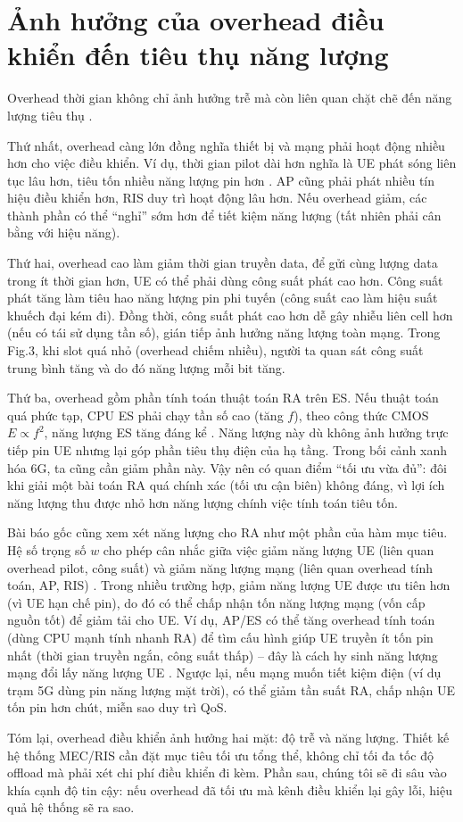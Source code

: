 \section{Ảnh hưởng của overhead điều khiển đến tiêu thụ năng lượng}

Overhead thời gian không chỉ ảnh hưởng trễ mà còn liên quan chặt chẽ đến năng lượng tiêu thụ .


Thứ nhất, overhead càng lớn đồng nghĩa thiết bị và mạng phải hoạt động nhiều hơn cho việc điều khiển. Ví dụ, thời gian pilot dài hơn nghĩa là UE phát sóng liên tục lâu hơn, tiêu tốn nhiều năng lượng pin hơn . AP cũng phải phát nhiều tín hiệu điều khiển hơn, RIS duy trì hoạt động lâu hơn. Nếu overhead giảm, các thành phần có thể “nghỉ” sớm hơn để tiết kiệm năng lượng (tất nhiên phải cân bằng với hiệu năng).


Thứ hai, overhead cao làm giảm thời gian truyền data, để gửi cùng lượng data trong ít thời gian hơn, UE có thể phải dùng công suất phát cao hơn. Công suất phát tăng làm tiêu hao năng lượng pin phi tuyến (công suất cao làm hiệu suất khuếch đại kém đi). Đồng thời, công suất phát cao hơn dễ gây nhiễu liên cell hơn (nếu có tái sử dụng tần số), gián tiếp ảnh hưởng năng lượng toàn mạng. Trong Fig.3, khi slot quá nhỏ (overhead chiếm nhiều), người ta quan sát công suất trung bình tăng và do đó năng lượng mỗi bit tăng.


Thứ ba, overhead gồm phần tính toán thuật toán RA trên ES. Nếu thuật toán quá phức tạp, CPU ES phải chạy tần số cao (tăng $f$), theo công thức CMOS $E \propto f^2$, năng lượng ES tăng đáng kể . Năng lượng này dù không ảnh hưởng trực tiếp pin UE nhưng lại góp phần tiêu thụ điện của hạ tầng. Trong bối cảnh xanh hóa 6G, ta cũng cần giảm phần này. Vậy nên có quan điểm “tối ưu vừa đủ”: đôi khi giải một bài toán RA quá chính xác (tối ưu cận biên) không đáng, vì lợi ích năng lượng thu được nhỏ hơn năng lượng chính việc tính toán tiêu tốn.


Bài báo gốc cũng xem xét năng lượng cho RA như một phần của hàm mục tiêu. Hệ số trọng số $w$ cho phép cân nhắc giữa việc giảm năng lượng UE (liên quan overhead pilot, công suất) và giảm năng lượng mạng (liên quan overhead tính toán, AP, RIS)  . Trong nhiều trường hợp, giảm năng lượng UE được ưu tiên hơn (vì UE hạn chế pin), do đó có thể chấp nhận tốn năng lượng mạng (vốn cấp nguồn tốt) để giảm tải cho UE. Ví dụ, AP/ES có thể tăng overhead tính toán (dùng CPU mạnh tính nhanh RA) để tìm cấu hình giúp UE truyền ít tốn pin nhất (thời gian truyền ngắn, công suất thấp) – đây là cách hy sinh năng lượng mạng đổi lấy năng lượng UE . Ngược lại, nếu mạng muốn tiết kiệm điện (ví dụ trạm 5G dùng pin năng lượng mặt trời), có thể giảm tần suất RA, chấp nhận UE tốn pin hơn chút, miễn sao duy trì QoS.

Tóm lại, overhead điều khiển ảnh hưởng hai mặt: độ trễ và năng lượng. Thiết kế hệ thống MEC/RIS cần đặt mục tiêu tối ưu tổng thể, không chỉ tối đa tốc độ offload mà phải xét chi phí điều khiển đi kèm. Phần sau, chúng tôi sẽ đi sâu vào khía cạnh độ tin cậy: nếu overhead đã tối ưu mà kênh điều khiển lại gây lỗi, hiệu quả hệ thống sẽ ra sao.